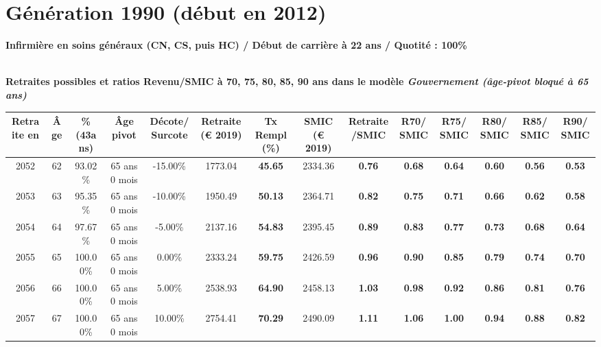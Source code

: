 \newpage 
 
\section{Génération 1990 (début en 2012)\label{Infirmier_100_1990_22_0}} 
 
{\bf \noindent Infirmière en soins généraux (CN, CS, puis HC) / Début de carrière à 22 ans / Quotité : 100\%}  ~ 

 ~\\{\bf \noindent Retraites possibles et ratios Revenu/SMIC à 70, 75, 80, 85, 90 ans dans le modèle \emph{Gouvernement (âge-pivot bloqué à 65 ans)}}  
 
\begin{adjustbox}{max width=\textwidth} 
\begin{tabular}[htb]{|c|c||c|c|c||c|c||c|c||c|c|c|c|c|} 
\hline 
 Retraite en &  Âge &  \%(43ans) &  Âge pivot &  Décote/Surcote &  Retraite (\euro{} 2019) &  Tx Rempl(\%) &  SMIC (\euro{} 2019) &  Retraite/SMIC &  R70/SMIC &  R75/SMIC &  R80/SMIC &  R85/SMIC &  R90/SMIC \\ 
\hline \hline 
 2052 &  62 &  93.02\% &  65 ans 0 mois &  -15.00\% &  1773.04 &  {\bf 45.65} &  2334.36 &  {\bf {\color{red} 0.76}} &  {\bf {\color{red} 0.68}} &  {\bf {\color{red} 0.64}} &  {\bf {\color{red} 0.60}} &  {\bf {\color{red} 0.56}} &  {\bf {\color{red} 0.53}} \\ 
\hline 
 2053 &  63 &  95.35\% &  65 ans 0 mois &  -10.00\% &  1950.49 &  {\bf 50.13} &  2364.71 &  {\bf {\color{red} 0.82}} &  {\bf {\color{red} 0.75}} &  {\bf {\color{red} 0.71}} &  {\bf {\color{red} 0.66}} &  {\bf {\color{red} 0.62}} &  {\bf {\color{red} 0.58}} \\ 
\hline 
 2054 &  64 &  97.67\% &  65 ans 0 mois &  -5.00\% &  2137.16 &  {\bf 54.83} &  2395.45 &  {\bf {\color{red} 0.89}} &  {\bf {\color{red} 0.83}} &  {\bf {\color{red} 0.77}} &  {\bf {\color{red} 0.73}} &  {\bf {\color{red} 0.68}} &  {\bf {\color{red} 0.64}} \\ 
\hline 
 2055 &  65 &  100.00\% &  65 ans 0 mois &  0.00\% &  2333.24 &  {\bf 59.75} &  2426.59 &  {\bf {\color{red} 0.96}} &  {\bf {\color{red} 0.90}} &  {\bf {\color{red} 0.85}} &  {\bf {\color{red} 0.79}} &  {\bf {\color{red} 0.74}} &  {\bf {\color{red} 0.70}} \\ 
\hline 
 2056 &  66 &  100.00\% &  65 ans 0 mois &  5.00\% &  2538.93 &  {\bf 64.90} &  2458.13 &  {\bf 1.03} &  {\bf {\color{red} 0.98}} &  {\bf {\color{red} 0.92}} &  {\bf {\color{red} 0.86}} &  {\bf {\color{red} 0.81}} &  {\bf {\color{red} 0.76}} \\ 
\hline 
 2057 &  67 &  100.00\% &  65 ans 0 mois &  10.00\% &  2754.41 &  {\bf 70.29} &  2490.09 &  {\bf 1.11} &  {\bf 1.06} &  {\bf {\color{red} 1.00}} &  {\bf {\color{red} 0.94}} &  {\bf {\color{red} 0.88}} &  {\bf {\color{red} 0.82}} \\ 
\hline 
\hline 
\end{tabular} 
\end{adjustbox} 
 
